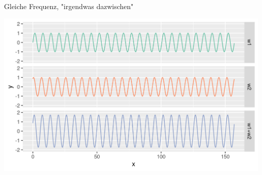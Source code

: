 \documentclass{beamer}
\begin{document}
\begin{frame}{Gleiche Frequenz, "irgendwas dazwischen"}

\begin{center}
    \includegraphics[width=\textwidth]{zwischen_interferenz.png}
\end{center}
    
\end{frame}
\end{document}
